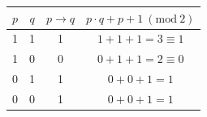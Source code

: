 \begin{table}[h!]
\centering
\begin{tabular}{cccc}
\hline
$p$ & $q$ & $p \rightarrow q$ & $p\cdot q + p + 1 \ (\mathrm{mod}\ 2)$ \\
\hline
1 & 1 & 1 & $1+1+1=3\equiv1$ \\
1 & 0 & 0 & $0+1+1=2\equiv0$ \\
0 & 1 & 1 & $0+0+1=1$ \\
0 & 0 & 1 & $0+0+1=1$ \\
\hline
\end{tabular}
\end{table}
